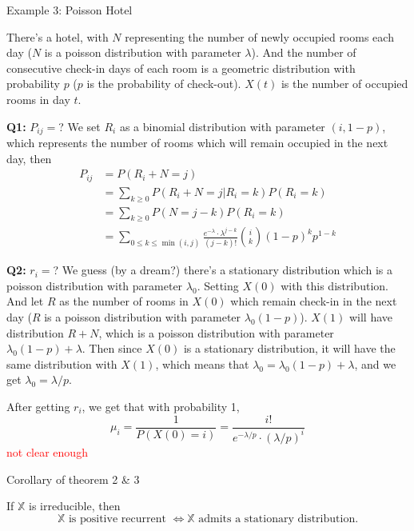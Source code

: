 \documentclass[mathserif]{beamer}
\begin{document}
\begin{frame}{Example 3: Poisson Hotel}
	\begin{example}
	There's a hotel, with $N$ representing the number of newly occupied rooms each day ($N$ is a poisson distribution with parameter $\lambda$).
	And the number of consecutive check-in days of each room is a geometric distribution with probability $p$ ($p$ is the probability of check-out).
	$X(t)$ is the number of occupied rooms in day $t$.
	\end{example}
\end{frame}

\begin{frame}{\textbf{Q1:} $P_{ij} = $?}
	We set $R_i$ as a binomial distribution with parameter $(i, 1-p)$, which represents the number of rooms which will remain occupied in the next day, then
	\begin{align*}
	P_{ij} & = P(R_i + N = j) \\
	& = \sum_{k\geq 0} P(R_i + N = j | R_i = k)P(R_i = k) \\
	& = \sum_{k\geq 0} P(N = j-k)P(R_i = k) \\
	& = \sum_{0 \leq k \leq \min(i,j)} \frac{e^{-\lambda}\cdot \lambda^{j-k}}{(j-k)!} \binom{i}{k} (1-p)^k p^{1-k}
	\end{align*}
\end{frame}

\begin{frame}{\textbf{Q2:} $r_i =$?}
	We guess (by a dream?) there's a stationary distribution which is a poisson distribution with parameter $\lambda_0$.
	Setting $X(0)$ with this distribution. 
	And let $R$ as the number of rooms in $X(0)$ which remain check-in in the next day ($R$ is a poisson distribution with parameter $\lambda_0 (1-p)$).
	$X(1)$ will have distribution $R + N$, which is a poisson distribution with parameter $\lambda_0 (1-p) + \lambda$.
	Then since $X(0)$ is a stationary distribution, it will have the same distribution with $X(1)$, which means that $\lambda_0 = \lambda_0 (1-p) + \lambda$, and we get $\lambda_0 = \lambda / p$.
	
	After getting $r_i$, we get that with probability 1, 
	\[
	\mu_i = \frac{1}{P(X(0)=i)} = \frac{i!}{e^{-\lambda/p}\cdot (\lambda/p)^i}
	\]
	\textcolor{red}{not clear enough}
\end{frame}

\begin{frame}{Corollary of theorem 2 \& 3}
\begin{corollary}
If $\mathbb{X}$ is irreducible, then
\[
\text{$\mathbb{X}$ is positive recurrent $\iff \mathbb{X}$ admits a stationary distribution.}
\]
\end{corollary}
\end{frame}
\end{document}
